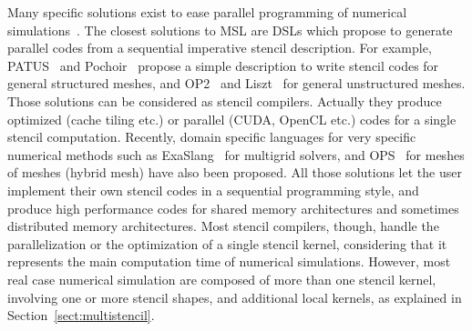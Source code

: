 
Many specific solutions exist to ease parallel programming of numerical simulations~\cite{Trilinos-Overview,petsc-efficient}. %
The closest solutions to MSL are DSLs which propose to generate parallel codes from a sequential imperative stencil description. For example, PATUS~\cite{citeulike12258902} and Pochoir~\cite{spaaTangCKLL11} propose a simple description to write stencil codes for general structured meshes, and OP2~\cite{Giles2011} and Liszt~\cite{DeVito2011LDS} for general unstructured meshes. Those solutions can be considered as stencil compilers. Actually they produce optimized (cache tiling etc.) or parallel (CUDA, OpenCL etc.) codes for a single stencil computation.
Recently, domain specific languages for very specific numerical methods such as ExaSlang~\cite{Schmitt:2014:EDL:2691166.2691171} for multigrid solvers, and OPS~\cite{Reguly:2014:ODS:2691166.2691173} for meshes of meshes (hybrid mesh) have also been proposed. 
All those solutions let the user implement their own stencil codes in a sequential programming style, and produce high performance codes for shared memory architectures and sometimes distributed memory architectures. 
Most stencil compilers, though, handle the parallelization or the optimization of a single stencil kernel, considering that it represents the main computation time of numerical simulations. However, most real case numerical simulation are composed of more than one stencil kernel, involving one or more stencil shapes, and additional local kernels, as explained in Section~\ref{sect:multistencil}.


